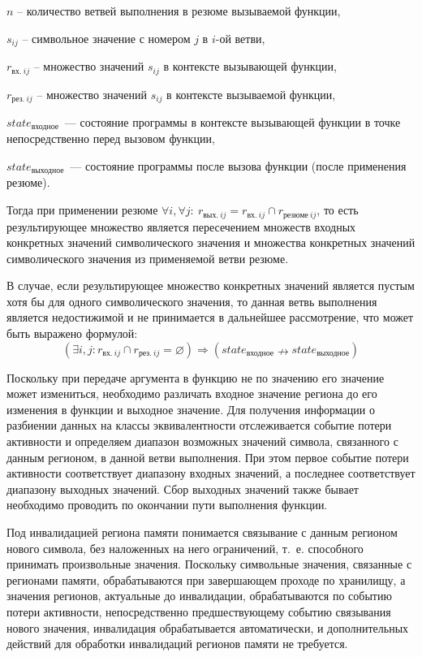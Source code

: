  $n$ – количество ветвей выполнения в резюме вызываемой функции,
 
 $s_{ij}$ – символьное значение с номером $j$ в $i$-ой ветви,
 
 $r_{\text{вх.}\ ij}$ – множество значений $s_{ij}$ в контексте вызывающей функции,
 
 $r_{\text{рез.}\ ij}$ – множество значений $s_{ij}$ в контексте вызываемой функции,
 
 $state_{\text{входное}}$~--- состояние программы в контексте вызывающей функции в точке непосредственно перед вызовом функции,

 $state_{\text{выходное}}$~--- состояние программы после вызова функции (после применения резюме).

Тогда при применении резюме $\forall i, \forall j:\ r_{\text{вых.}\ ij} =  r_{\text{вх.}\ ij} \cap r_{\text{резюме}\ ij}$, то есть результирующее множество является пересечением множеств входных конкретных значений символического значения и множества конкретных значений символического значения из применяемой ветви резюме.

В случае, если результирующее множество конкретных значений является пустым хотя бы для одного символического значения, то данная ветвь выполнения является недостижимой и не принимается в дальнейшее рассмотрение, что может быть выражено формулой:
\begin{equation*}
 \label{empty_set}
 (\exists i, j: r_{\text{вх.}\ ij} \cap r_{\text{рез.}\ ij} = \varnothing)  \Rightarrow (state_{\text{входное}} \nrightarrow state_{\text{выходное}})
\end{equation*}

Поскольку при передаче аргумента в функцию не по значению его значение может измениться, необходимо различать входное значение региона до его изменения в функции и выходное значение. Для получения информации о разбиении данных на классы эквивалентности отслеживается событие потери активности и определяем диапазон возможных значений символа, связанного с данным регионом, в данной ветви выполнения. При этом первое событие потери активности соответствует диапазону входных значений, а последнее соответствует диапазону выходных значений. Сбор выходных значений также бывает необходимо проводить по окончании пути выполнения функции.

Под инвалидацией региона памяти понимается связывание с данным регионом нового символа, без наложенных на него ограничений, т.~е. способного принимать произвольные значения. Поскольку символьные значения, связанные с регионами памяти, обрабатываются при завершающем проходе по хранилищу, а значения регионов, актуальные до инвалидации, обрабатываются по событию потери активности, непосредственно предшествующему событию связывания нового значения, инвалидация обрабатывается автоматически, и дополнительных действий для обработки инвалидаций регионов памяти не требуется.


